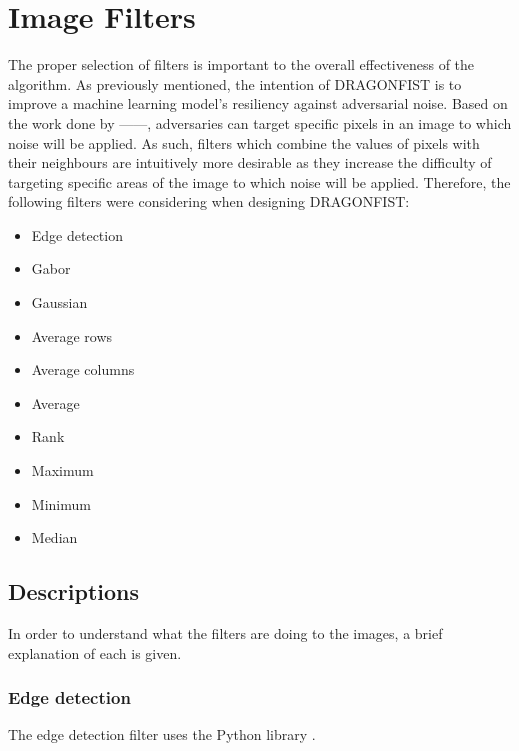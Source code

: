 \section{Image Filters} \label{s:filters}
	The proper selection of filters is important to the overall effectiveness of the algorithm. As previously mentioned, the intention of DRAGONFIST is to improve a machine learning model's resiliency against adversarial noise. Based on the work done by ------, adversaries can target specific pixels in an image to which noise will be applied. As such, filters which combine the values of pixels with their neighbours are intuitively more desirable as they increase the difficulty of targeting specific areas of the image to which noise will be applied. Therefore, the following filters were considering when designing DRAGONFIST:
	\begin{multicols}{2}
		\begin{itemize}
			\item Edge detection
			\item Gabor
			\item Gaussian
			\item Average rows
			\item Average columns
			\item Average
			\item Rank
			\item Maximum
			\item Minimum
			\item Median
		\end{itemize}
	\end{multicols}

	\subsection{Descriptions} \label{s:filters:descriptions}
		In order to understand what the filters are doing to the images, a brief explanation of each is given.

		\subsubsection{Edge detection} \label{s:filters:descriptions:edgeDetection}
			The edge detection filter uses the Python library  \cite{skikitImageFiltersSobel}.

